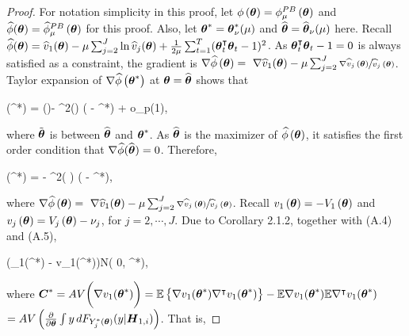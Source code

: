 \begin{proof} For notation simplicity in this proof, let $\phi\left(\boldsymbol{\theta}\right) = \phi^{PB}_{\mu}\left(\boldsymbol{\theta}\right)$ and $\widehat{\phi}(\boldsymbol{\theta}) = \widehat{\phi}^{PB}_{\mu}\left(\boldsymbol{\theta}\right)$ for this proof. Also, let $\boldsymbol{\theta}^* = \boldsymbol{\theta}^*_{\nu}(\mu)$ and $\widehat{\boldsymbol{\theta}} = \widehat{\boldsymbol{\theta}}_{\nu}(\mu)$ here.
	Recall $ \widehat{\phi}(\boldsymbol{\theta}) = \widehat{v}_1(\boldsymbol{\theta}) - \mu \sum_{j=2}^J \ln \widehat{v}_j(\boldsymbol{\theta}) + \frac{1}{2\mu}\sum_{t=1}^{T}(\boldsymbol{\theta}^{\intercal}_t\boldsymbol{\theta}_t - 1)^2$.  As  $\boldsymbol{\theta}_t^{\intercal}\boldsymbol{\theta}_t-1=0$ is always satisfied as a constraint, the gradient is $\nabla\widehat{\phi}\left(\boldsymbol{\theta}\right) = \,\,\nabla\widehat{v}_1(\boldsymbol{\theta}) - \mu \sum_{j=2}^J \sfrac{\nabla\widehat{v}_j\left( \boldsymbol{\theta}\right)}{\widehat{v}_j\left( \boldsymbol{\theta}\right)}$. Taylor expansion of $\nabla\widehat{\phi}\left(\boldsymbol{\theta}^*\right)$ at $\boldsymbol{\theta} = \widehat{\boldsymbol{\theta}}$ shows that
	\begin{flalign*}
	\nabla\wh{\phi}\lt(\bs{\theta}^*\rt) =  \nabla\wh{\phi}(\wh{\bs{\theta}})- \nabla^2\wh{\phi}(\tilde{\bs{\theta}}) (\widehat{\bs{\theta}} - \bs{\theta}^{*}) + o_p(1),
	\end{flalign*}
	where $\tilde{\boldsymbol{\theta}}$ is between $\widehat{\boldsymbol{\theta}}$ and $\boldsymbol{\theta}^*$. As $\widehat{\boldsymbol{\theta}}$ is the maximizer of $\widehat{\phi}\left(\boldsymbol{\theta}\right)$, it satisfies the first order condition that $\nabla \widehat{\phi}(\widehat{\boldsymbol{\theta}}) = 0$. Therefore, 
	\begin{flalign}
	\nabla\wh{\phi}\lt(\bs{\theta}^*\rt) =   -  \nabla^2\wh{\phi}( \tilde{\bs{\theta}}) (\widehat{\bs{\theta}} - \bs{\theta}^{*}),
	\end{flalign}
	where $\nabla\widehat{\phi}\left(\boldsymbol{\theta}\right) = \,\,\nabla\widehat{v}_1(\boldsymbol{\theta}) - \mu \sum_{j=2}^J \sfrac{\nabla\widehat{v}_j\left( \boldsymbol{\theta}\right)}{\widehat{v}_j\left( \boldsymbol{\theta}\right)}$.
	Recall $v_1\left(\boldsymbol{\theta}\right)=- V_1\left(\boldsymbol{\theta}\right)$ and  $v_j\left(\boldsymbol{\theta}\right) = V_j\left(\boldsymbol{\theta}\right) - \nu_j$, for $j = 2, \cdots, J$.  Due to Corollary 2.1.2, together with (A.4) and (A.5),
	\begin{flalign}
	\bigg(\nabla{}_1(\bs{\theta}^*) - \nabla v_1(\bs{\theta}^*)\bigg)N\lt( 0, ^*\rt),
	\end{flalign}
		where $\boldsymbol{C}^*=AV\bigg(\nabla v_1(\boldsymbol{\theta}^*)\bigg) =\mathbb{E}\left\{  \nabla v_1(\boldsymbol{\theta}^*)\nabla^{\intercal} v_1(\boldsymbol{\theta}^*) \right\} - \mathbb{E}\nabla v_1(\boldsymbol{\theta}^*) \mathbb{E}\nabla^{\intercal} v_1(\boldsymbol{\theta}^*)$\\
		$ = AV\lt(\pard[\bs{\theta}]\int y \,d  F_{Y_j^*(\bs{\theta})}(y | \bs{H}_{1,i} )\rt)$. That is,

\end{proof}
